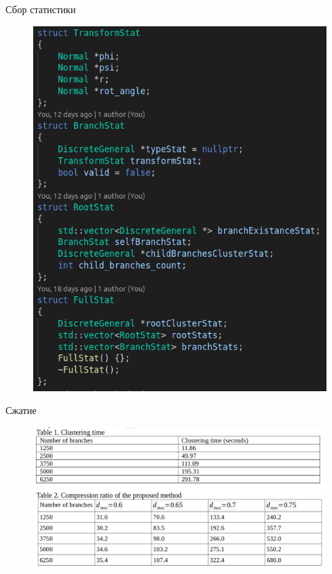 \documentclass[14pt]{beamer}
\begin{document}
\begin{frame}{Сбор статистики}
\begin{figure}[hbtp]
\includegraphics[scale=0.3]{stat.png}
\end{figure}
\end{frame}


\begin{frame}{Сжатие}
\begin{figure}[hbtp]
\includegraphics[scale=0.17]{tables.png}
\end{figure}
\end{frame}
\end{document}
